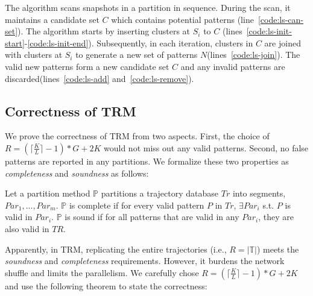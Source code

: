 The algorithm scans snapshots in a partition in sequence. During the scan, it
maintains a candidate set $C$ which contains potential patterns (line~\ref{code:ls-can-set}).
The algorithm starts by inserting clusters at $S_i$ to $C$ (lines~\ref{code:ls-init-start}-\ref{code:ls-init-end}).
Subsequently, in each iteration, clusters in $C$ are joined with clusters at $S_i$ to generate
a new set of patterns $N$(lines~\ref{code:ls-join}). The valid new patterns 
form a new candidate set $C$ and any invalid patterns are discarded(lines~\ref{code:ls-add} and~\ref{code:ls-remove}).


\subsection{Correctness of TRM}
We prove the correctness of TRM from two aspects. First,
the choice of $R = (\lceil \frac{K}{L} \rceil -1)*G+2K$ would 
not miss out any valid patterns. Second, no false patterns
are reported in any partitions. We formalize these two 
properties as \emph{completeness} and \emph{soundness} as follows:

\begin{definition}
Let a partition method $\mathbb{P}$ partitions a trajectory database $Tr$ 
into segments, $Par_1,...,Par_m$. $\mathbb{P}$ is complete 
if for every valid pattern $P$ in $Tr$, $\exists Par_i$ s.t. $P$ is valid in $Par_i$. 
$\mathbb{P}$ is sound if for all patterns that are valid in any $Par_i$, they are also valid in $TR$.
\end{definition}

Apparently, in TRM, replicating the entire trajectories (i.e., $R=\mathbb{|T|}$)
meets the \emph{soundness} and \emph{completeness} requirements. However, it burdens the network shuffle and limits the parallelism. We carefully chose $R = (\lceil \frac{K}{L} \rceil -1)*G+2K$ and use
the following theorem to state the correctness:

